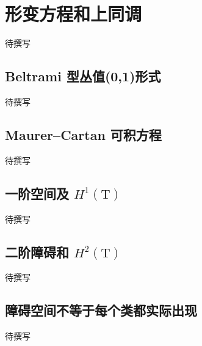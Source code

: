 
% 
% 

\section{形变方程和上同调}
\label{g4:sec:2902}

待撰写

\subsection{Beltrami 型丛值(0,1)形式}
\label{g4:subsec:2902:01}
待撰写

\subsection{Maurer–Cartan 可积方程}
\label{g4:subsec:2902:02}
待撰写

\subsection{\texorpdfstring{一阶空间及 \(H^1(\mathrm{T})\)}{一阶空间及 H¹(T)}}
\label{g4:subsec:2902:03}
待撰写

\subsection{\texorpdfstring{二阶障碍和 \(H^2(\mathrm{T})\)}{二阶障碍和 H²(T)}}
\label{g4:subsec:2902:04}
待撰写

\subsection{障碍空间不等于每个类都实际出现}
\label{g4:subsec:2902:05}
待撰写
